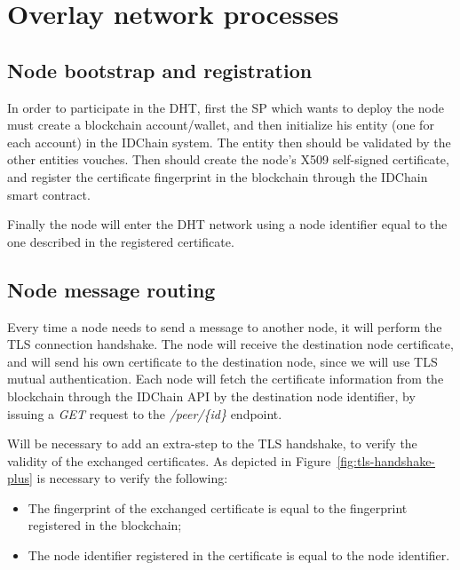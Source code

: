 {\section{Overlay network processes}

\subsection{Node bootstrap and registration}
In order to participate in the DHT, first the \ac{SP} which wants to deploy the node must create a blockchain account/wallet, and then initialize his entity (one for each account) in the IDChain system.
The entity then should be validated by the other entities vouches.
Then should create the node's X509 self-signed certificate, and register the certificate fingerprint in the blockchain through the IDChain smart contract.

Finally the node will enter the DHT network using a node identifier equal to the one described in the registered certificate.




\subsection{Node message routing}
Every time a node needs to send a message to another node, it will perform the TLS connection handshake.
The node will receive the destination node certificate, and will send his own certificate to the destination node, since we will use TLS mutual authentication.
Each node will fetch the certificate information from the blockchain through the IDChain API by the destination node identifier, by issuing a \textit{GET} request to the \textit{/peer/\{id\}} endpoint.

Will be necessary to add an extra-step to the TLS handshake, to verify the validity of the exchanged certificates.
As depicted in Figure~\ref{fig:tls-handshake-plus} is necessary to verify the following:

\begin{itemize}
  \item The fingerprint of the exchanged certificate is equal to the fingerprint registered in the blockchain;
  \item The node identifier registered in the certificate is equal to the node identifier.
\end{itemize}

}
